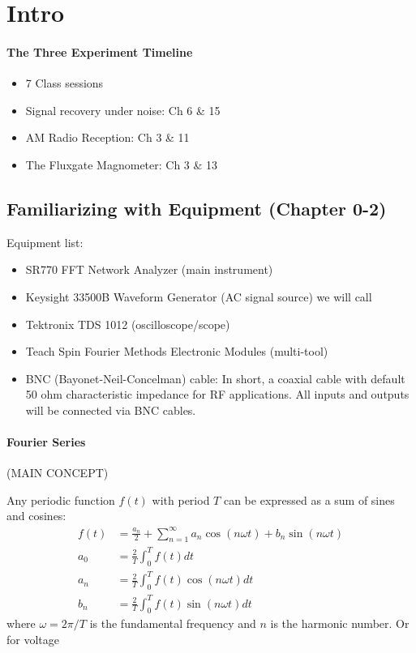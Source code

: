 \documentclass[../main.tex]{subfiles}
\begin{document}
\pagestyle{fancy}

\section*{Intro}


\paragraph*{The Three Experiment Timeline}
\begin{itemize}
    \item 7 Class sessions
    \item Signal recovery under noise: Ch 6 \& 15
    \item AM Radio Reception: Ch 3 \& 11
    \item The Fluxgate Magnometer: Ch 3 \& 13
\end{itemize}

\subsection{Familiarizing with Equipment (Chapter 0-2)}

Equipment list:
\begin{itemize}
    \item SR770 FFT Network Analyzer (main instrument)
    \item Keysight 33500B Waveform Generator (AC signal source) we will call 
    \item Tektronix TDS 1012 (oscilloscope/scope)
    \item Teach Spin Fourier Methods Electronic Modules (multi-tool)
    \item BNC (Bayonet-Neil-Concelman) cable: In short, a coaxial cable with default 50 ohm characteristic impedance for RF applications.
    All inputs and outputs will be connected via BNC cables.
\end{itemize}

\paragraph*{Fourier Series} (MAIN CONCEPT)

Any periodic function $f(t)$ with period $T$ can be expressed as a sum of sines and cosines:
\begin{align*}
    f(t) &= \frac{a_n}{2} + \sum_{n=1}^{\infty} a_n \cos(n\omega t) + b_n \sin(n\omega t)\\
    a_0 &= \frac{2}{T} \int_{0}^{T} f(t) dt\\
    a_n &= \frac{2}{T} \int_{0}^{T} f(t) \cos(n\omega t) dt\\
    b_n &= \frac{2}{T} \int_{0}^{T} f(t) \sin(n\omega t) dt
\end{align*}
where $\omega = 2\pi/T$ is the fundamental frequency and $n$ is the harmonic number. Or for voltage
\end{document}
